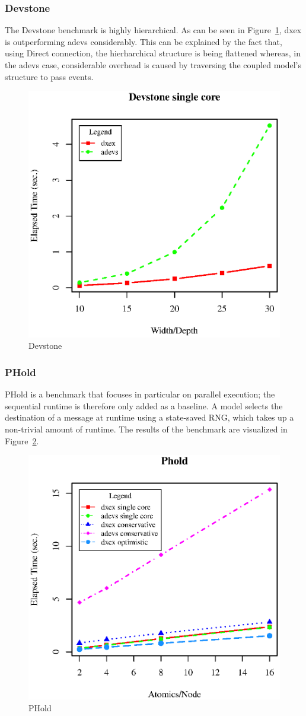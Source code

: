 \subsubsection{Devstone}
The Devstone \cite{DEVStone} benchmark is highly hierarchical. As can be seen in Figure~\ref{fig:Devstone}, dxex is outperforming adevs considerably. This can be explained by the fact that, using Direct connection, the hierharchical structure is being flattened whereas, in the adevs case, considerable overhead is caused by traversing the coupled model's structure to pass events.
\begin{figure}[h]
	\includegraphics[width=.5\textwidth]{fig/fig1.eps}
	\caption{Devstone}
	\label{fig:Devstone}
\end{figure}

\subsubsection{PHold}
PHold \cite{PHOLD} is a benchmark that focuses in particular on parallel execution; the sequential runtime is therefore only added as a baseline. A model selects the destination of a message at runtime using a state-saved RNG, which takes up a non-trivial amount of runtime. The results of the benchmark are visualized in Figure~\ref{fig:PHold}.
\begin{figure}[h]
	\includegraphics[width=.5\textwidth]{fig/fig4.eps}
	\caption{PHold}
	\label{fig:PHold}
\end{figure}

